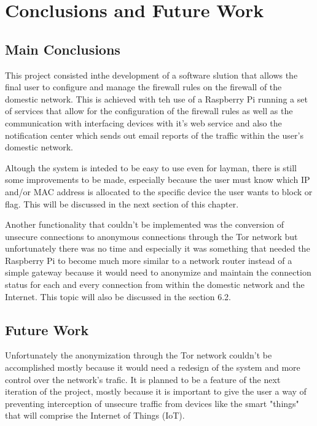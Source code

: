 \chapter{Conclusions and Future Work}
\label{chap:conc-future-work}

\section{Main Conclusions}
\label{sec:main-concs}

This project consisted inthe development of a software slution that allows the
final user to configure and manage the firewall rules on the firewall of the
domestic network. This is achieved with teh use of a Raspberry Pi running a set
of services that allow for the configuration of the firewall rules as well as
the communication with interfacing devices with it's web service and also the
notification center which sends out email reports of the traffic within the
user's domestic network.

Altough the system is inteded to be easy to use even for layman, there is still
some improvements to be made, especially because the user must know which IP
and/or MAC address is allocated to the specific device the user wants to block
or flag. This will be discussed in the next section of this chapter.

Another functionality that couldn't be implemented was the conversion of
unsecure connections to anonymous connections through the Tor network but
unfortunately there was no time and especially it was something that needed the
Raspberry Pi to become much more similar to a network router instead of a simple
gateway because it would need to anonymize and maintain the connection status
for each and every connection from within the domestic network and the Internet.
This topic will also be discussed in the section 6.2.

\section{Future Work}
\label{sec:future-work}

Unfortunately the anonymization through the Tor network couldn't be accomplished
mostly because it would need a redesign of the system and more control over the
network's trafic. It is planned to be a feature of the next iteration of the
project, mostly because it is important to give the user a way of preventing
interception of unsecure traffic from devices like the smart "things" that will
comprise the Internet of Things (IoT).

